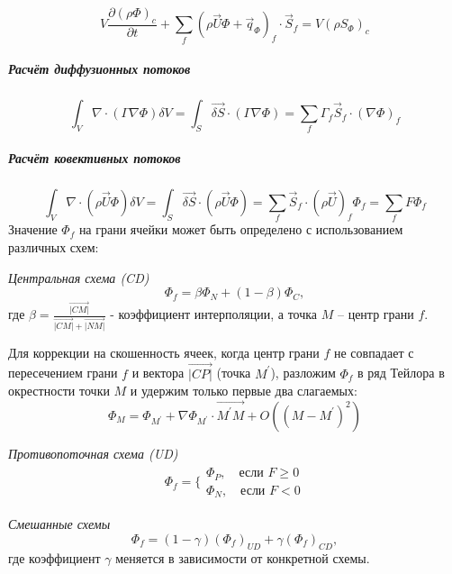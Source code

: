 			\begin{equation}
				V\frac{\partial \left( \rho \Phi \right)_c}{\partial t} + \sum_f \left( \rho \vec{U} \Phi + \vec{q}_{\Phi} \right)_f \cdot \vec{S}_f = V \left( \rho S_{\Phi} \right)_c
			\end{equation}
		\subparagraph{Расчёт диффузионных потоков}
		\begin{equation}
			\int_V \nabla \cdot \left( \Gamma \nabla \Phi \right) \delta V = \int_S \vec{\delta S} \cdot (\Gamma \nabla \Phi) = \sum_f \Gamma_f \vec{S}_f \cdot (\nabla \Phi)_f
		\end{equation}
		\subparagraph{Расчёт ковективных потоков}
		\begin{equation}
			\int_V \nabla \cdot (\rho \vec{U} \Phi) \delta V = \int_S \vec{\delta S} \cdot (\rho \vec{U} \Phi) = \sum_f \vec{S}_f \cdot (\rho \vec{U})_f \Phi_f = \sum_f F \Phi_f
		\end{equation}
		Значение $\Phi_f$ на грани ячейки может быть определено с использованием различных схем:
		
		\textit{Центральная схема (CD)}
		\begin{equation}
		\Phi_f = \beta \Phi_N + (1-\beta)\Phi_C,
		\end{equation}
		где $\beta=\frac{\vec{|CM|}}{\vec{|CM|} + \vec{|NM|}}$ - коэффициент интерполяции, а точка $M$ -- центр грани $f$.
		
		Для коррекции на скошенность ячеек, когда центр грани $f$ не совпадает с пересечением грани $f$ и вектора $\vec{|CP|}$ (точка $M^{'}$), разложим $\Phi_f$ в ряд Тейлора в окрестности точки $M$ и удержим только первые два слагаемых:
		\begin{equation}
			\Phi_M = \Phi_{M^{'}} + \nabla \Phi_{M^{'}} \cdot \vec{M^{'}M} + O\left(\left(M-M^{'}\right)^2\right)
		\end{equation}
		
		\textit{Противопоточная схема (UD)}
		\begin{equation}
			\begin{aligned}
				\Phi_f = \Bigg\{	\begin{array}{l}
					\Phi_P, \quad \text{если } F \geq 0 \\
					\Phi_N, \quad \text{если } F < 0
				\end{array}
			\end{aligned}
		\end{equation}
		
		\textit{Смешанные схемы}
		\begin{equation}
			\Phi_f = \left(1-\gamma\right)(\Phi_f)_{UD} + \gamma (\Phi_f)_{CD},
		\end{equation}
		где коэффициент $\gamma$ меняется в зависимости от конкретной схемы.
		
